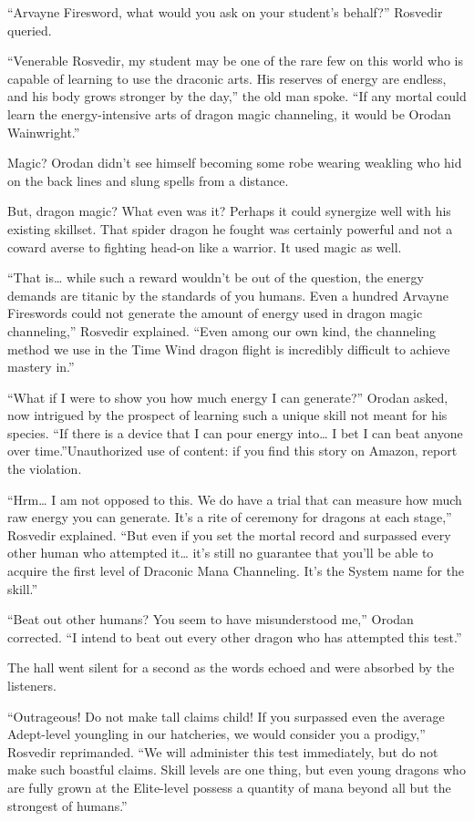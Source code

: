\documentclass[a4paper,10pt]{book}
\begin{document}
“Arvayne Firesword, what would you ask on your student’s behalf?” Rosvedir queried.\par
“Venerable Rosvedir, my student may be one of the rare few on this world who is capable of learning to use the draconic arts. His reserves of energy are endless, and his body grows stronger by the day,” the old man spoke. “If any mortal could learn the energy-intensive arts of dragon magic channeling, it would be Orodan Wainwright.”\par
Magic? Orodan didn’t see himself becoming some robe wearing weakling who hid on the back lines and slung spells from a distance.\par
But, dragon magic? What even was it? Perhaps it could synergize well with his existing skillset. That spider dragon he fought was certainly powerful and not a coward averse to fighting head-on like a warrior. It used magic as well.\par
“That is… while such a reward wouldn’t be out of the question, the energy demands are titanic by the standards of you humans. Even a hundred Arvayne Fireswords could not generate the amount of energy used in dragon magic channeling,” Rosvedir explained. “Even among our own kind, the channeling method we use in the Time Wind dragon flight is incredibly difficult to achieve mastery in.”\par
“What if I were to show you how much energy I can generate?” Orodan asked, now intrigued by the prospect of learning such a unique skill not meant for his species. “If there is a device that I can pour energy into… I bet I can beat anyone over time.”Unauthorized use of content: if you find this story on Amazon, report the violation.\par
“Hrm… I am not opposed to this. We do have a trial that can measure how much raw energy you can generate. It's a rite of ceremony for dragons at each stage,” Rosvedir explained. “But even if you set the mortal record and surpassed every other human who attempted it… it’s still no guarantee that you’ll be able to acquire the first level of Draconic Mana Channeling. It’s the System name for the skill.”\par
“Beat out other humans? You seem to have misunderstood me,” Orodan corrected. “I intend to beat out every other dragon who has attempted this test.”\par
The hall went silent for a second as the words echoed and were absorbed by the listeners.\par
“Outrageous! Do not make tall claims child! If you surpassed even the average Adept-level youngling in our hatcheries, we would consider you a prodigy,” Rosvedir reprimanded. “We will administer this test immediately, but do not make such boastful claims. Skill levels are one thing, but even young dragons who are fully grown at the Elite-level possess a quantity of mana beyond all but the strongest of humans.”\par
\end{document}
